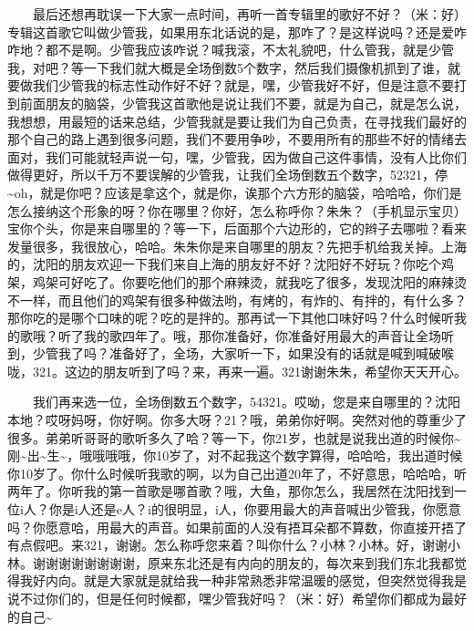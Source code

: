 \documentclass[]{ctexbook}
\begin{document}
  最后还想再耽误一下大家一点时间，再听一首专辑里的歌好不好？（米：好）专辑这首歌它叫做少管我，如果用东北话说的是，那咋了？是这样说吗？还是爱咋咋地？都不是啊。少管我应该咋说？喊我滚，不太礼貌吧，什么管我，就是少管我，对吧？等一下我们就大概是全场倒数5个数字，然后我们摄像机抓到了谁，就要做我们少管我的标志性动作好不好？就是，嘿，少管我好不好，但是注意不要打到前面朋友的脑袋，少管我这首歌他是说让我们不要，就是为自己，就是怎么说，我想想，用最短的话来总结，少管我就是要让我们为自己负责，在寻找我们最好的那个自己的路上遇到很多问题，我们不要用争吵，不要用所有的那些不好的情绪去面对，我们可能就轻声说一句，嘿，少管我，因为做自己这件事情，没有人比你们做得更好，所以千万不要误解的少管我，让我们全场倒数五个数字，52321，停\textasciitilde oh，就是你吧？应该是拿这个，就是你，诶那个六方形的脑袋，哈哈哈，你们是怎么接纳这个形象的呀？你在哪里？你好，怎么称呼你？朱朱？（手机显示宝贝）宝你个头，你是来自哪里的？等一下，后面那个六边形的，它的辫子去哪啦？看来发量很多，我很放心，哈哈。朱朱你是来自哪里的朋友？先把手机给我关掉。上海的，沈阳的朋友欢迎一下我们来自上海的朋友好不好？沈阳好不好玩？你吃个鸡架，鸡架可好吃了。你要吃他们的那个麻辣烫，就我吃了很多，发现沈阳的麻辣烫不一样，而且他们的鸡架有很多种做法哟，有烤的，有炸的、有拌的，有什么多？那你吃的是哪个口味的呢？吃的是拌的。那再试一下其他口味好吗？什么时候听我的歌哦？听了我的歌四年了。哦，那你准备好，你准备好用最大的声音让全场听到，少管我了吗？准备好了，全场，大家听一下，如果没有的话就是喊到喊破喉咙，321。这边的朋友听到了吗？来，再来一遍。321谢谢朱朱，希望你天天开心。

  我们再来选一位，全场倒数五个数字，54321。哎呦，您是来自哪里的？沈阳本地？哎呀妈呀，你好啊。你多大呀？21？哦，弟弟你好啊。突然对他的尊重少了很多。弟弟听哥哥的歌听多久了哈？等一下，你21岁，也就是说我出道的时候你\textasciitilde 刚\textasciitilde 出\textasciitilde 生\textasciitilde，哦哦哦哦，你10岁了，对不起我这个数字算得，哈哈哈，我出道时候你10岁了。你什么时候听我歌的啊，以为自己出道20年了，不好意思，哈哈哈，听两年了。你听我的第一首歌是哪首歌？哦，大鱼，那你怎么，我居然在沈阳找到一位i人？你是i人还是e人？i的很明显，i人，你要用最大的声音喊出少管我，你愿意吗？你愿意哈，用最大的声音。如果前面的人没有捂耳朵都不算数，你直接开捂了有点假吧。来321，谢谢。怎么称呼您来着？叫你什么？小林？小林。好，谢谢小林。谢谢谢谢谢谢谢谢，原来东北还是有内向的朋友的，每次来到我们东北我都觉得我好内向。就是大家就是就给我一种非常熟悉非常温暖的感觉，但突然觉得我是说不过你们的，但是任何时候都，嘿少管我好吗？（米：好）希望你们都成为最好的自己\textasciitilde{}
\end{document}
